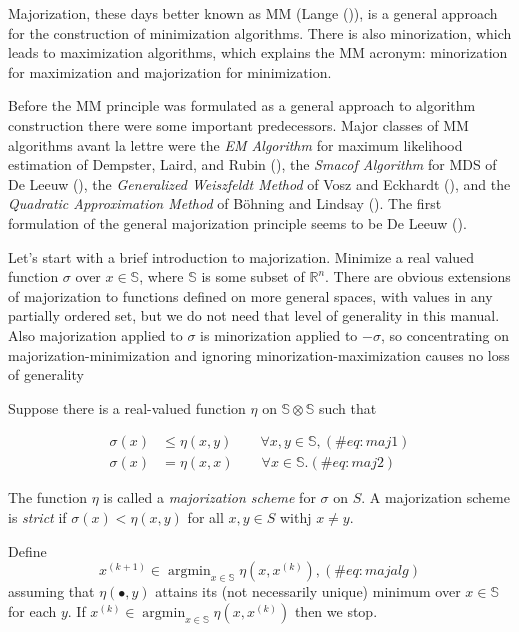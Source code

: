 \documentclass[
  12pt,
  letterpaper,
  DIV=11,
  numbers=noendperiod]{scrartcl}
\theoremstyle{plain}
\theoremstyle{remark}
\begin{document}
Majorization, these days better known as MM (Lange
()), is a general approach for the
construction of minimization algorithms. There is also minorization,
which leads to maximization algorithms, which explains the MM acronym:
minorization for maximization and majorization for minimization.

Before the MM principle was formulated as a general approach to
algorithm construction there were some important predecessors. Major
classes of MM algorithms avant la lettre were the \emph{EM Algorithm}
for maximum likelihood estimation of Dempster, Laird, and Rubin
(), the \emph{Smacof
Algorithm} for MDS of De Leeuw (), the
\emph{Generalized Weiszfeldt Method} of Vosz and Eckhardt
(), and the \emph{Quadratic
Approximation Method} of Böhning and Lindsay
(). The first formulation of the
general majorization principle seems to be De Leeuw
().

Let's start with a brief introduction to majorization. Minimize a real
valued function \(\sigma\) over \(x\in\mathbb{S}\), where \(\mathbb{S}\)
is some subset of \(\mathbb{R}^n\). There are obvious extensions of
majorization to functions defined on more general spaces, with values in
any partially ordered set, but we do not need that level of generality
in this manual. Also majorization applied to \(\sigma\) is minorization
applied to \(-\sigma\), so concentrating on majorization-minimization
and ignoring minorization-maximization causes no loss of generality

Suppose there is a real-valued function \(\eta\) on
\(\mathbb{S}\otimes\mathbb{S}\) such that

\begin{align}
\sigma(x)&\leq\eta(x,y)\qquad\forall x,y\in\mathbb{S},(\#eq:maj1)\\
\sigma(x)&=\eta(x,x)\qquad\forall x\in\mathbb{S}.(\#eq:maj2)
\end{align}

The function \(\eta\) is called a \emph{majorization scheme} for
\(\sigma\) on \(S\). A majorization scheme is \emph{strict} if
\(\sigma(x)<\eta(x,y)\) for all \(x,y\in S\) withj \(x\not=y\).

Define \begin{equation}
x^{(k+1)}\in\mathop{\text{argmin}}_{x\in\mathbb{S}}\eta(x,x^{(k)}),
(\#eq:majalg)
\end{equation} assuming that \(\eta(\bullet,y)\) attains its (not
necessarily unique) minimum over \(x\in\mathbb{S}\) for each \(y\). If
\(x^{(k)}\in\mathop{\text{argmin}}_{x\in\mathbb{S}}\eta(x,x^{(k)})\)
then we stop.
\end{document}
